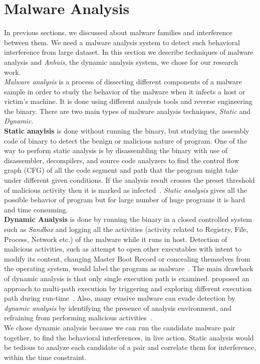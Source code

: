 \section{Malware Analysis}
\label{sec:Malware Analysis}
In previous sections, we discussed about malware families and interference between them.
We need a malware analysis system to detect such behavioral interference from large dataset.
In this section we describe techniques of malware analysis and \emph{Anbuis}, the dynamic analysis system, we chose for our research work.\\
\emph{Malware analysis} is a process of dissecting different components of a malware sample in order to study the behavior of the malware when it infects a host or victim's machine.
It is done using different analysis tools and reverse engineering the binary.
There are two main types of malware analysis techniques, \emph{Static} and \emph{Dynamic}.\\
\textbf{Static anaylsis} is done without running the binary, but studying the assembly code of binary to detect the benign or malicious nature of program.
One of the way to perform static analysis is by disassembling the binary with use of disassembler, decompilers, and source code analyzers to find the control flow graph (CFG) of all the code segment and path that the program might take under different given conditions.
If the analysis result crosses the preset threshold of malicious activity then it is marked as infected~\cite[]{sharma2014}.
\emph{Static analysis} gives all the possible behavior of program but for large number of huge programs it is hard and time consuming.\\
\textbf{Dynamic Analysis} is done by running the binary in a closed controlled system such as \emph{Sandbox} and logging all the activities (activity related to Registry, File, Process, Network etc.) of the malware while it runs in host.
Detection of malicious activities, such as attempt to open other executables with intent to modify its content, changing Master Boot Record or concealing themselves from the operating system, would label the program as malware~\cite[]{sharma2014}.
The main drawback of dynamic analysis is that only single execution path is examined.
\citeauthor{chipounov2012s2e} proposed an approach to multi-path execution by triggering and exploring different execution path during run-time~\cite[]{chipounov2012s2e}.
Also, many evasive malware can evade detection by \emph{dynamic analysis} by identifying the presence of analysis environment, and refraining from performing malicious activities~\cite[]{barecloud}.
\\
We chose dynamic analysis because we can run the candidate malware pair together, to find the behavioral interferences, in live action.
Static analysis would be tedious to analyze each candidate of a pair and correlate them for interference, within the time constraint.

